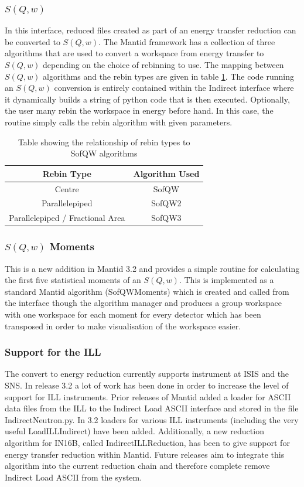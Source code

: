 \documentclass[paper=a4, fontsize=11pt]{scrartcl}	%
\numberwithin{equation}{section}															%
\numberwithin{figure}{section}																%
\numberwithin{table}{section}																%
\begin{document}
\subsubsection{$S(Q,w)$}
\label{subsec:sofqw}
In this interface, reduced files created as part of an energy transfer reduction can be converted to $S(Q,w)$. The Mantid framework has a collection of three algorithms that are used to convert a workspace from energy transfer to $S(Q,w)$ depending on the choice of rebinning to use. The mapping between $S(Q,w)$ algorithms and the rebin types are given in table \ref{table:sofqw-algorithms}. The code running an $S(Q,w)$ conversion is entirely contained within the Indirect interface where it dynamically builds a string of python code that is then executed. Optionally, the user many rebin the workspace in energy before hand. In this case, the routine simply calls the rebin algorithm with given parameters.

\begin{table}[H]
\begin{center}
\begin{tabular}{ c c}
Rebin Type & Algorithm Used \\ \hline
Centre & SofQW \\
Parallelepiped & SofQW2 \\
Parallelepiped / Fractional Area & SofQW3 \\
\end{tabular}
\caption{Table showing the relationship of rebin types to SofQW algorithms}
\label{table:sofqw-algorithms}
\end{center}
\end{table}

\subsubsection{$S(Q,w)$ Moments}
This is a new addition in Mantid 3.2 and provides a simple routine for calculating the first five statistical moments of an $S(Q,w)$. This is implemented as a standard Mantid algorithm (SofQWMoments) which is created and called from the interface though the algorithm manager and produces a group workspace with one workspace for each moment for every detector which has been transposed in order to make visualisation of the workspace easier.

\subsubsection{Support for the ILL}
The convert to energy reduction currently supports instrument at ISIS and the SNS. In release 3.2 a lot of work has been done in order to increase the level of support for ILL instruments. Prior releases of Mantid added a loader for ASCII data files from the ILL to the Indirect Load ASCII interface and stored in the file IndirectNeutron.py. In 3.2 loaders for various ILL instruments (including the very useful LoadILLIndirect) have been added. Additionally, a new reduction algorithm for IN16B, called IndirectILLReduction, has been to give support for energy transfer reduction within Mantid. Future releases aim to integrate this algorithm into the current reduction chain and therefore complete remove Indirect Load ASCII from the system.
\end{document}
